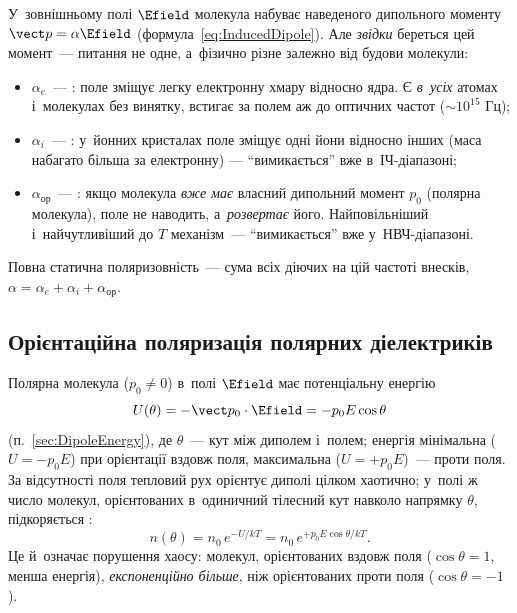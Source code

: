 У~зовнішньому полі $\Efield$ молекула набуває наведеного дипольного моменту $\vect p =
	\alpha\Efield$ (формула~\eqref{eq:InducedDipole}). Але \emph{звідки} береться цей
момент~--- питання не одне, а~фізично різне залежно від будови молекули:

\begin{itemize}
	\item $\alpha_e$~--- : поле зміщує легку електронну хмару відносно
	      ядра. Є \emph{в~усіх} атомах і~молекулах без винятку, встигає за полем аж до
	      оптичних частот ($\sim10^{15}$ Гц);
	\item $\alpha_i$~--- : у~йонних кристалах поле зміщує одні йони відносно
	      інших (маса набагато більша за електронну) --- \enquote{вимикається} вже
	      в~ІЧ-діапазоні;
	\item $\alpha_\text{ор}$~--- : якщо молекула \emph{вже має}
	      власний дипольний момент $p_0$ (полярна молекула), поле не наводить,
	      а~\emph{розвертає} його. Найповільніший і~найчутливіший до $T$ механізм~---
	      \enquote{вимикається} вже у~НВЧ-діапазоні.
\end{itemize}

Повна статична поляризовність~--- сума всіх діючих на цій частоті внесків, $\alpha =
	\alpha_e + \alpha_i + \alpha_\text{ор}$.


\subsection*{Орієнтаційна поляризація полярних діелектриків}\label{sec:Langevin-Debye}


Полярна молекула ($p_0\neq0$) в~полі $\Efield$ має потенціальну енергію
\begin{equation*}
	U(\theta) = -\vect p_0\cdot\Efield = -p_0 E\cos\theta
\end{equation*}
(п.~\ref{sec:DipoleEnergy}), де $\theta$~--- кут між диполем і~полем; енергія мінімальна
($U=-p_0E$) при орієнтації вздовж поля, максимальна ($U=+p_0E$)~--- проти поля. За
відсутності поля тепловий рух орієнтує диполі цілком хаотично; у~полі ж число молекул,
орієнтованих в~одиничний тілесний кут навколо напрямку $\theta$, підкоряється
:
\begin{equation}\label{eq:Boltzmann}
	n(\theta) = n_0\, e^{-U/kT} = n_0\, e^{+p_0 E\cos\theta / kT}.
\end{equation}
Це й~означає порушення хаосу: молекул, орієнтованих вздовж поля ($\cos\theta=1$, менша
енергія), \emph{експоненційно більше}, ніж орієнтованих проти поля ($\cos\theta=-1$).

